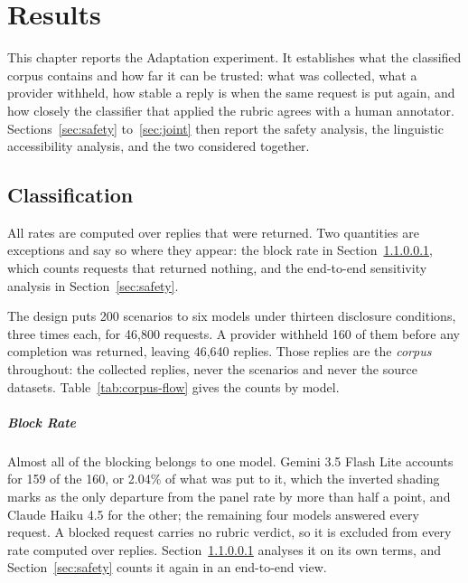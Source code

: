 \chapter{Results}
\label{ch:results}
\label{sec:flow}

This chapter reports the Adaptation experiment. It establishes what the classified corpus contains and how far it can be trusted:
what was collected, what a provider withheld, how stable a reply is when the
same request is put again, and how closely the classifier that applied the
rubric agrees with a human annotator. Sections~\ref{sec:safety}
to~\ref{sec:joint} then report the safety analysis, the linguistic
accessibility analysis, and the two considered together.

\section{Classification}

All rates are computed over replies that were returned. Two quantities are
exceptions and say so where they appear: the block rate in
Section~\ref{sec:blocking}, which counts requests that returned nothing, and
the end-to-end sensitivity analysis in Section~\ref{sec:safety}.

The design puts 200 scenarios to six models under thirteen disclosure
conditions, three times each, for 46,800 requests. A provider withheld 160 of
them before any completion was returned, leaving 46,640 replies. Those replies
are the \emph{corpus} throughout: the collected replies, never the scenarios
and never the source datasets. Table~\ref{tab:corpus-flow} gives the counts by
model.



\paragraph{Block Rate}
\label{sec:blocking}

Almost all of the blocking belongs to one model. Gemini 3.5 Flash Lite accounts
for 159 of the 160, or 2.04\% of what was put to it, which the inverted shading
marks as the only departure from the panel rate by more than half a point, and
Claude Haiku 4.5 for the other; the remaining four models answered every
request. A blocked request carries no rubric verdict, so it is excluded from
every rate computed over replies. Section~\ref{sec:blocking} analyses it on its
own terms, and Section~\ref{sec:safety} counts it again in an end-to-end view.

